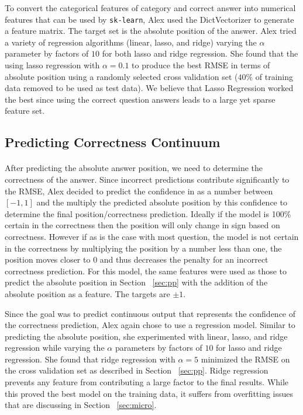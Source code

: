 \documentclass[letterpaper]{article}
\begin{document}
To convert the categorical features of category and correct answer into numerical features that can be used by \lstinline{sk-learn}, Alex used the DictVectorizer to generate a feature matrix.  The target set is the absolute position of the answer.  Alex tried a variety of regression algorithms (linear, lasso, and ridge) varying the $\alpha$ parameter by factors of $10$ for both lasso and ridge regression.  She found that the using lasso regression with $\alpha=0.1$ to produce the best RMSE in terms of absolute position using a randomly selected cross validation set ($40\%$ of training data removed to be used as test data).  We believe that Lasso Regression worked the best since using the correct question answers leads to a large yet sparse feature set.

\subsection{Predicting Correctness Continuum}
\label{sec:pc}
\paragraph{} After predicting the absolute answer position, we need to determine the correctness of the answer.  Since incorrect predictions contribute significantly to the RMSE, Alex decided to predict the confidence in as a number between $[-1,1]$ and the multiply the predicted absolute position by this confidence to determine the final position/correctness prediction.  Ideally if the model is 100\% certain in the correctness then the position will only change in sign based on correctness.  However if as is the case with most question, the model is not certain in the correctness by multiplying the position by a number less than one, the position moves closer to 0 and thus decreases the penalty for an incorrect correctness prediction.  For this model, the same features were used as those to predict the absolute position in Section ~\ref{sec:pp} with the addition of the absolute position as a feature.  The targets are $\pm 1$.

Since the goal was to predict continuous output that represents the confidence of the correctness prediction, Alex again chose to use a regression model.  Similar to predicting the absolute position, she experimented with linear, lasso, and ridge regression while varying the $\alpha$ parameters by factors of $10$ for lasso and ridge regression.  She found that ridge regression with $\alpha=5$ minimized the RMSE on the cross validation set as described in Section ~\ref{sec:pp}.  Ridge regression prevents any feature from contributing a large factor to the final results.  While this proved the best model on the training data, it suffers from overfitting issues that are discussing in Section ~\ref{sec:micro}.
\end{document}
